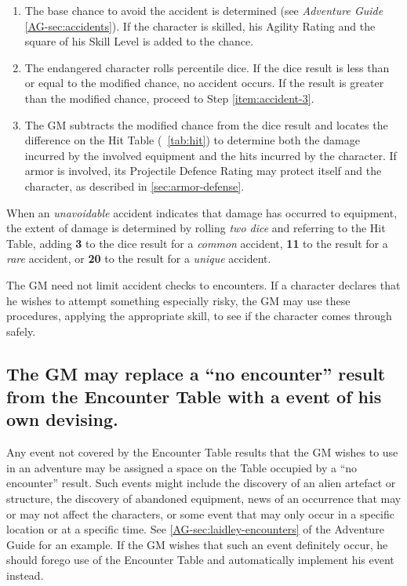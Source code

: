 \begin{enumerate}
\item The base chance to avoid the accident is determined (see
  \emph{Adventure Guide} \ref{AG-sec:accidents}). If the character is
  skilled, his Agility Rating
  and the square of his Skill Level is added to the chance.
\item The endangered character rolls percentile dice. If the dice
  result is less than or equal to the modified chance, no
  accident occurs. If the result is greater than the modified chance,
  proceed to Step \ref{item:accident-3}.
\item The GM subtracts the modified chance from the dice result and
  locates the difference on the Hit Table (~\ref{tab:hit}) to
  determine both the damage incurred by the involved equipment and the
  hits incurred by the character. If armor is involved, its Projectile
  Defence Rating may protect itself and the character, as described in
  \ref{sec:armor-defense}.\label{item:accident-3}
\end{enumerate}

When an \emph{unavoidable} accident indicates that damage has occurred
to equipment, the extent of damage is determined by rolling \emph{two
  dice} and referring to the Hit Table, adding \textbf{3} to the dice
result for a \emph{common} accident, \textbf{11} to the result for a
\emph{rare} accident, or \textbf{20} to the result for a \emph{unique}
accident.

The GM need not limit accident checks to encounters. If a character
declares that he wishes to attempt something especially risky, the GM
may use these procedures, applying the appropriate skill, to see if
the character comes through safely.


\subsection[``No Encounter'']{The GM may replace a ``no encounter''
  result from the Encounter Table with a event of his own devising.} 
\label{sec:no-encounter}



Any event not covered by the Encounter Table results that the GM
wishes to use in an adventure may be assigned a space on the Table
occupied by a ``no encounter'' result. Such events might include the
discovery of an alien artefact or structure, the discovery of
abandoned equipment, news of an occurrence that may or may not affect
the characters, or some event that may only occur in a specific
location or at a specific time. See \ref{AG-sec:laidley-encounters} of
the Adventure 
Guide for an example. If the GM wishes that such an event definitely
occur, he should forego use of the Encounter Table and automatically
implement his event instead.



